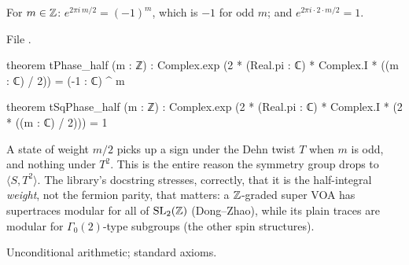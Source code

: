 \begin{theorem}\label{l14:thm:tphase}
For $m\in{\mathbb{Z}}$: $e^{2\pi i\,m/2} = (-1)^m$, which is $-1$ for odd $m$; and $e^{2\pi i\cdot2\cdot m/2} = 1$.
\end{theorem}
\noindent File .
\begin{leancode}
theorem tPhase_half (m : ℤ) :
    Complex.exp (2 * (Real.pi : ℂ) * Complex.I * ((m : ℂ) / 2)) = (-1 : ℂ) ^ m

theorem tSqPhase_half (m : ℤ) :
    Complex.exp (2 * (Real.pi : ℂ) * Complex.I * (2 * ((m : ℂ) / 2))) = 1
\end{leancode}
\begin{physics}
A state of weight $m/2$ picks up a sign under the Dehn twist $T$ when $m$ is odd, and nothing under $T^2$. This is the entire
reason the symmetry group drops to $\langle S,T^2\rangle$. The library's docstring stresses, correctly, that it is the
half-integral \emph{weight}, not the fermion parity, that matters: a ${\mathbb{Z}}$-graded super VOA has supertraces modular for all of
$\mathrm{SL}_2(\mathbb{Z})$ (Dong--Zhao), while its plain traces are modular for $\Gamma_0(2)$-type subgroups (the other spin structures).
\end{physics}
\begin{status}
Unconditional arithmetic; standard axioms.
\end{status}

